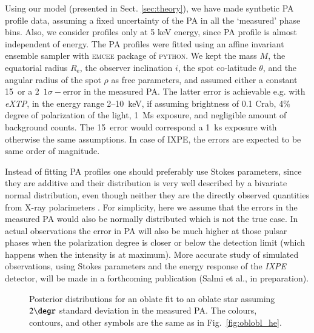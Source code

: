 \documentclass{aa}
\newcommand{\blue}[1]{\textcolor{blue}{#1}}
\newcommand{\req}{R_{\mathrm{e}}}
\begin{document}
Using our model (presented in Sect. \ref{sec:theory}), we have made synthetic PA profile data, assuming a fixed uncertainty of the PA in all the `measured' phase bins.
Also, we consider profiles only at 5 keV energy, since PA profile is almost independent of energy.
The PA profiles were fitted using an affine invariant ensemble sampler with \textsc{emcee} \citep{emcee} package of \textsc{python}. 
We kept the mass $M$, the equatorial radius $\req$, the observer inclination $i$, the spot co-latitude $\theta$, and the angular radius of the spot $\rho$ as free parameters, and assumed either a  constant 15\degr\ or a 2\degr\ $1\sigma-$error in the measured PA.
The latter error is achievable e.g. with \textit{eXTP}, in the energy range 2--10~keV, if assuming brightness of 0.1 Crab, 4\% degree of polarization of the light, 1~Ms exposure, and negligible amount of background counts.
The 15\degr\ error would correspond a 1~ks exposure with otherwise the same assumptions.
In case of IXPE, the errors are expected to be same order of magnitude.

Instead of fitting PA profiles one should preferably use Stokes parameters, since they are additive and their distribution is very well described by a bivariate normal distribution, even though neither they are the directly observed quantities from X-ray polarimeters \citep[see][]{KCB15}.
For simplicity, here we assume that the errors in the measured PA would also be normally distributed which is not the true case. 
In actual observations the error in PA will also be much higher at those pulsar phases when the polarization degree is closer or below the detection limit (which happens when the intensity is at maximum). 
More accurate study of simulated observations, using Stokes parameters and the energy response of the \textit{IXPE} detector, will be made in a forthcoming publication (Salmi et al., in preparation).


\begin{figure}
\caption{
Posterior distributions for an oblate fit to an oblate star assuming $2\degr$ standard deviation in the measured PA. 
The colours, contours, and other symbols are the same as in Fig.~\ref{fig:oblobl_he}.
} 
\label{fig:oblobl_le}
\end{figure}
\end{document}
